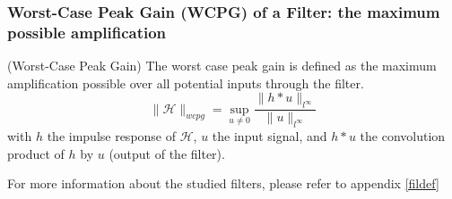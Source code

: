 	\subsubsection{Worst-Case Peak Gain (WCPG) of a Filter: the maximum possible amplification}
	\begin{thdef} (Worst-Case Peak Gain)
		The worst case peak gain is defined as the maximum amplification
		possible over all potential inputs through the filter.
		$$\|\mathcal{H}\|_{wcpg}=\sup_{u\neq0}\frac{\|h*u\|_{l^{\infty}}}{\|u\|_{l^{\infty}}}$$
		with $h$ the impulse response of $\mathcal{H}$, $u$ the input signal, and $h * u$ the convolution product of $h$ by $u$ (output of the
				filter).
	
	\end{thdef}

\begingroup

	\fontsize{7}{9}\selectfont
	For more information about the studied filters, please refer to appendix \ref{fildef}
\endgroup
%
%
%

